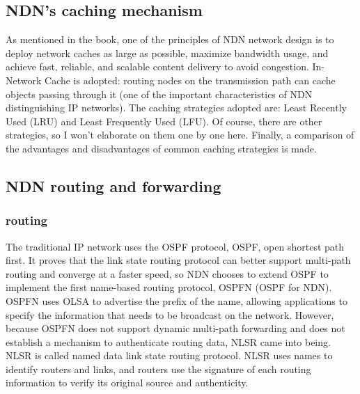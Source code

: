 \documentclass[conference]{IEEEtran}
\begin{document}
\subsection{NDN's caching mechanism}
As mentioned in the book, one of the principles of NDN network design is to deploy network caches as large as possible, maximize bandwidth usage, and achieve fast, reliable, and scalable content delivery to avoid congestion. In-Network Cache is adopted: routing nodes on the transmission path can cache objects passing through it (one of the important characteristics of NDN distinguishing IP networks). The caching strategies adopted are: Least Recently Used (LRU) and Least Frequently Used (LFU). Of course, there are other strategies, so I won't elaborate on them one by one here. Finally, a comparison of the advantages and disadvantages of common caching strategies is made.


\subsection{NDN routing and forwarding}
\subsubsection{routing}
The traditional IP network uses the OSPF protocol, OSPF, open shortest path first. It proves that the link state routing protocol can better support multi-path routing and converge at a faster speed, so NDN chooses to extend OSPF to implement the first name-based routing protocol, OSPFN (OSPF for NDN). OSPFN uses OLSA to advertise the prefix of the name, allowing applications to specify the information that needs to be broadcast on the network. However, because OSPFN does not support dynamic multi-path forwarding and does not establish a mechanism to authenticate routing data, NLSR came into being. NLSR is called named data link state routing protocol. NLSR uses names to identify routers and links, and routers use the signature of each routing information to verify its original source and authenticity.
\end{document}
